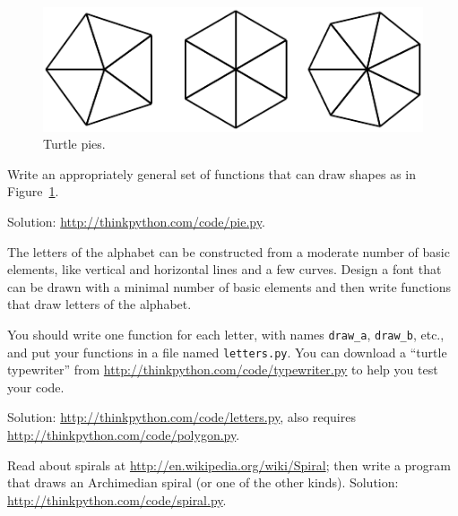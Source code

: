 \documentclass[10pt]{book}
\begin{document}
\begin{CJK}{UTF8}{gbsn}
\begin{exercise}
\end{exercise}

\begin{figure}
\centerline
{\includegraphics[scale=0.8]{figs/pies.pdf}}
\caption{Turtle pies.}
\label{fig.pies}
\end{figure}


\begin{exercise}

Write an appropriately general set of functions that
can draw shapes as in Figure~\ref{fig.pies}.

Solution: \url{http://thinkpython.com/code/pie.py}.

\end{exercise}

\begin{exercise}

The letters of the alphabet can be constructed from a moderate number
of basic elements, like vertical and horizontal lines and a few
curves.  Design a font that can be drawn with a minimal number of
basic elements and then write functions that draw letters of the
alphabet.

You should write one function for each letter, with names
\verb"draw_a", \verb"draw_b", etc., and put your functions
in a file named {\tt letters.py}.  You can download a
``turtle typewriter'' from \url{http://thinkpython.com/code/typewriter.py}
to help you test your code.

Solution: \url{http://thinkpython.com/code/letters.py}, also requires
\url{http://thinkpython.com/code/polygon.py}.

\end{exercise}

\begin{exercise}

Read about spirals at \url{http://en.wikipedia.org/wiki/Spiral}; then
write a program that draws an Archimedian spiral (or one of the other
kinds).  Solution: \url{http://thinkpython.com/code/spiral.py}.


\end{exercise}
\end{CJK}
\end{document}
